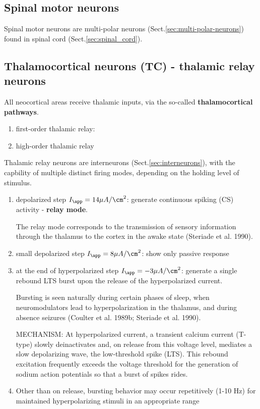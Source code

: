\subsection{Spinal motor neurons}
\label{sec:spinal-motor-neurons}

Spinal motor neurons are multi-polar neurons
(Sect.\ref{sec:multi-polar-neurons}) found in spinal cord
(Sect.\ref{sec:spinal_cord}).

\subsection{Thalamocortical neurons (TC) - thalamic relay neurons}
\label{sec:thalamocortical-neuron}
\label{sec:thalamic-relay-neuron}


All neocortical areas receive thalamic inputs, via the so-called {\bf
thalamocortical pathways}.
\begin{enumerate}
  \item first-order thalamic relay: 
  
  \item high-order thalamic relay
\end{enumerate}

Thalamic relay neurons are interneurons (Sect.\ref{sec:interneurons}), with
the capbility of multiple distinct firing modes, depending on the holding
level of stimulus.
\begin{enumerate}
  \item depolarized step $I_\app = 14 \mu A/\cm^2$: generate continuous spiking
  (CS) activity - {\bf relay mode}.
  
The relay mode corresponds to the transmission of sensory information through
the thalamus to the cortex in the awake state (Steriade et al. 1990).
  
  \item small depolarized step $I_\app = 8 \mu A/\cm^2$: show only passive
  response
  
  \item at the end of hyperpolarized step $I_\app = -3 \mu A/\cm^2$: generate a
  single rebound LTS burst upon the release of the hyperpolarized current.

Bursting is seen naturally during certain phases of sleep, when neuromodulators
lead to hyperpolarization in the thalamus, and during absence seizures (Coulter
et al. 1989b; Steriade et al. 1990).
  
MECHANISM: At hyperpolarized current, a transient calcium current (T-type)
slowly deinactivates and, on release from this voltage level, mediates a slow
depolarizing wave, the low-threshold spike (LTS). This rebound excitation
frequently exceeds the voltage threshold for the generation of sodium action
potentials so that a burst of spikes rides. 
   
   \item Other than on release, bursting behavior may
occur repetitively (1-10 Hz) for maintained hyperpolarizing
stimuli in an appropriate range 
\end{enumerate} 

